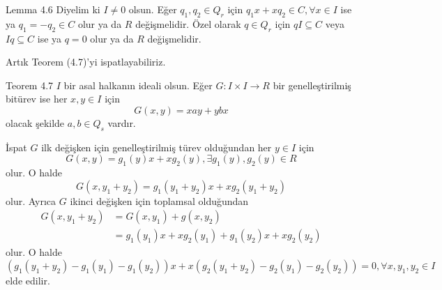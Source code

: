 \documentclass{beamer}
\begin{document}
\begin{frame}

\begin{block}{Lemma 4.6}
Diyelim ki $I \neq 0$ olsun. Eğer $q_1, q_2 \in Q_r$ için $q_1x + xq_2 \in C, \forall x \in I$ ise ya $q_1 = -q_2 \in C$ olur ya da $R$ değişmelidir. Özel olarak $q \in Q_r$ için $qI \subseteq C$ veya $Iq \subseteq C$ ise ya $q = 0$ olur ya da $R$ değişmelidir.
\end{block}

Artık Teorem (4.7)'yi ispatlayabiliriz.
    
\end{frame}

\begin{frame}

\begin{block}{Teorem 4.7}
$I$ bir asal halkanın ideali olsun. Eğer $G \colon I \times I \to R$ bir genelleştirilmiş bitürev ise her $x, y \in I$ için
\begin{equation*}
    G(x, y) = xay + ybx
\end{equation*}
olacak şekilde $a, b \in Q_s$ vardır.
\end{block}
    
\end{frame}

\begin{frame}
\footnotesize

\begin{block}{İspat}
$G$ ilk değişken için genelleştirilmiş türev olduğundan her $y \in I$ için
\begin{equation*}
    G(x,y) = g_1(y)x + xg_2(y), \exists g_1(y), g_2(y) \in R
\end{equation*}
olur. O halde
\begin{equation*}
    G(x,y_1+y_2) = g_1(y_1+y_2)x + xg_2(y_1+y_2)
\end{equation*}
olur. Ayrıca $G$ ikinci değişken için toplamsal olduğundan
\begin{align*}
    G(x,y_1+y_2) &= G(x,y_1) + g(x,y_2)\\
    &= g_1(y_1)x + xg_2(y_1) + g_1(y_2)x + xg_2(y_2)
\end{align*}
olur. O halde
\begin{equation*}
    (g_1(y_1+y_2)-g_1(y_1)-g_1(y_2))x+x(g_2(y_1+y_2)-g_2(y_1)-g_2(y_2)) = 0, \forall x, y_1, y_2 \in I
\end{equation*}
elde edilir.
\end{block}
    
\end{frame}
\end{document}
